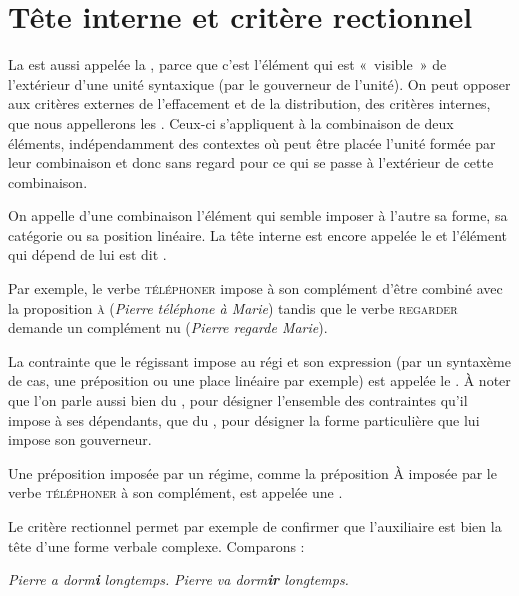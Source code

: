\section{Tête interne et critère rectionnel}\label{sec:3.3.16}

La  est aussi appelée la , parce que c’est l’élément qui est «~visible~» de l’extérieur d’une unité syntaxique (par le gouverneur de l'unité). On peut opposer aux critères externes de l’effacement et de la distribution, des critères internes, que nous appellerons les . Ceux-ci s’appliquent à la combinaison de deux éléments, indépendamment des contextes où peut être placée l’unité formée par leur combinaison et donc sans regard pour ce qui se passe à l’extérieur de cette combinaison.

{On appelle  d’une combinaison l’élément qui semble imposer à l’autre sa forme, sa catégorie ou sa position linéaire. La tête interne est encore appelée le  et l’élément qui dépend de lui est dit .}

Par exemple, le verbe \textsc{téléphoner} impose à son complément d’être combiné avec la proposition \textsc{à} (\textit{Pierre téléphone à Marie}) tandis que le verbe \textsc{regarder} demande un complément nu (\textit{Pierre regarde Marie}).

{La contrainte que le régissant impose au régi et son expression (par un syntaxème de cas, une préposition ou une place linéaire par exemple) est appelée le . À noter que l’on parle aussi bien du , pour désigner l’ensemble des contraintes qu’il impose à ses dépendants, que du , pour désigner la forme particulière que lui impose son gouverneur.}

Une préposition imposée par un régime, comme la préposition À imposée par le verbe \textsc{téléphoner} à son complément, est appelée une .

Le critère rectionnel permet par exemple de confirmer que l’auxiliaire est bien la tête d’une forme verbale complexe. Comparons :

\ea
  \ea \textit{Pierre a dorm\textbf{i}  longtemps.}
  \ex \textit{Pierre va dorm\textbf{ir}  longtemps.}
  \z
\z

